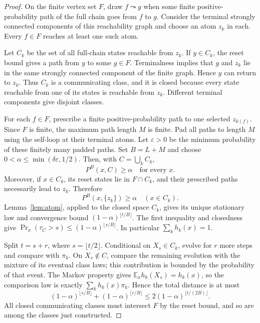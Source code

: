 \documentclass[11pt]{article}
\begin{document}
\begin{proof}
On the finite vertex set $F$, draw $f\leadsto g$ when some
finite positive-probability path of the full chain goes from $f$
to $g$. Consider the terminal strongly connected components of
this reachability graph and choose an atom $z_k$ in each.
Every $f\in F$ reaches at least one such atom.

Let $C_k$ be the set of all full-chain states reachable from $z_k$.
If $y\in C_k$, the reset bound gives a path from $y$ to some
$g\in F$. Terminalness implies that $g$ and $z_k$ lie in the
same strongly connected component of the finite graph. Hence
$y$ can return to $z_k$. Thus $C_k$ is a communicating class,
and it is closed because every state reachable from one of its
states is reachable from $z_k$. Different terminal components
give disjoint classes.

For each $f\in F$, prescribe a finite positive-probability path to
one selected $z_{k(f)}$. Since $F$ is finite, the maximum path
length $M$ is finite. Pad all paths to length $M$ using the
self-loop at their terminal atoms. Let $\varepsilon>0$ be the
minimum probability of these finitely many padded paths.
Set $B=L+M$ and choose
$0<\alpha\le\min(\delta\varepsilon,1/2)$.
Then, with $C=\bigcup_k C_k$,
\[
 P^B(x,C)\ge\alpha\quad\text{for every }x.
\]
Moreover, if $x\in C_k$, its reset states lie in $F\cap C_k$,
and their prescribed paths necessarily lead to $z_k$. Therefore
\[
 P^B(x,\{z_k\})\ge\alpha\quad (x\in C_k).
\]
Lemma~\ref{lem:atom}, applied to the closed space $C_k$, gives
its unique stationary law and convergence bound
$(1-\alpha)^{\lfloor t/B\rfloor}$.
The first inequality and closedness give
$\Pr_x(\tau_C>s)\le(1-\alpha)^{\lfloor s/B\rfloor}$.
In particular $\sum_k h_k(x)=1$.

Split $t=s+r$, where $s=\lfloor t/2\rfloor$. Conditional on
$X_s\in C_k$, evolve for $r$ more steps and compare with $\pi_k$.
On $X_s\notin C$, compare the remaining evolution with the
mixture of its eventual class laws; this contribution is bounded
by the probability of that event. The Markov property gives
$\mathbb E_x h_k(X_s)=h_k(x)$, so the comparison law is exactly
$\sum_k h_k(x)\pi_k$. Hence the total distance is at most
\[
 (1-\alpha)^{\lfloor s/B\rfloor}
 +(1-\alpha)^{\lfloor r/B\rfloor}
 \le2(1-\alpha)^{\lfloor t/(2B)\rfloor}.
\]
All closed communicating classes must intersect $F$ by the reset
bound, and so are among the classes just constructed.
\end{proof}
\end{document}
